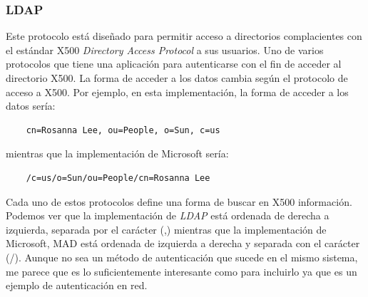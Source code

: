 \documentclass[titlepage, 12pt, a4paper]{article}
\begin{document}
\subsubsection{\Gls{LDAP}}
Este protocolo está diseñado para permitir acceso a directorios complacientes con el estándar \Gls{X500} \textit{Directory Access Protocol} a sus usuarios. Uno de varios protocolos que tiene una aplicación para autenticarse con el fin de acceder al directorio \Gls{X500}\cite{LDAP}. La forma de acceder a los datos cambia según el protocolo de acceso a \Gls{X500}. Por ejemplo, en esta implementación, la forma de acceder a los datos sería:
\begin{verbatim}
	cn=Rosanna Lee, ou=People, o=Sun, c=us
\end{verbatim}
mientras que la implementación de Microsoft sería:
\begin{verbatim}
	/c=us/o=Sun/ou=People/cn=Rosanna Lee
\end{verbatim}
Cada uno de estos protocolos define una forma de buscar en \Gls{X500} información. Podemos ver que la implementación de \textit{\Gls{LDAP}} está ordenada de derecha a izquierda, separada por el carácter (,) mientras que la implementación de Microsoft, \Gls{MAD} está ordenada de izquierda a derecha y separada con el carácter (/).
Aunque no sea un método de autenticación que sucede en el mismo sistema, me parece que es lo suficientemente interesante como para incluirlo ya que es un ejemplo de autenticación en red.
\end{document}

